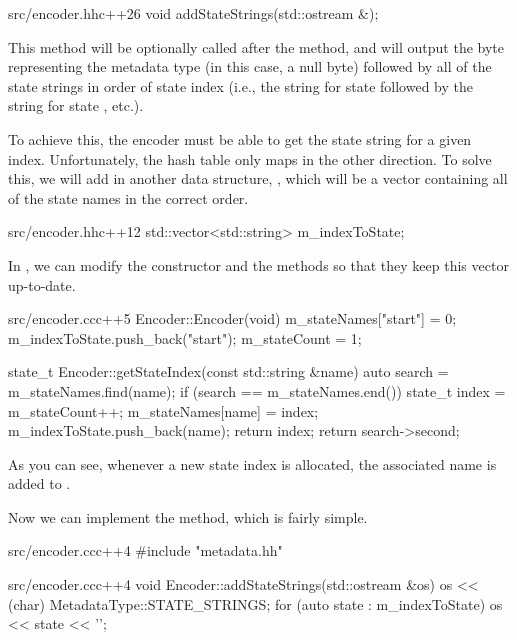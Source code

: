 \begin{file}{src/encoder.hh}{c++}{26}
    void addStateStrings(std::ostream &);
\end{file}

This method will be optionally called after the  method, and will output the byte representing the metadata type (in this case, a null byte) followed by all of the state strings in order of state index (i.e., the string for state  followed by the string for state , etc.).

To achieve this, the encoder must be able to get the state string for a given index. Unfortunately, the  hash table only maps in the other direction. To solve this, we will add in another data structure, , which will be a vector containing all of the state names in the correct order.

\begin{file}{src/encoder.hh}{c++}{12}
    std::vector<std::string> m_indexToState;
\end{file}

In , we can modify the constructor and the  methods so that they keep this vector up-to-date.

\begin{file}{src/encoder.cc}{c++}{5}
Encoder::Encoder(void)
{
    m_stateNames["start"] = 0;
    m_indexToState.push_back("start");
    m_stateCount = 1;
}

state_t Encoder::getStateIndex(const std::string &name)
{
    auto search = m_stateNames.find(name);
    if (search == m_stateNames.end())
    {
        state_t index = m_stateCount++;
        m_stateNames[name] = index;
        m_indexToState.push_back(name);
        return index;
    }
    return search->second;
}
\end{file}

As you can see, whenever a new state index is allocated, the associated name is added to .

Now we can implement the  method, which is fairly simple.

\begin{file}{src/encoder.cc}{c++}{4}
#include "metadata.hh"
\end{file}

\begin{file}{src/encoder.cc}{c++}{4}
void Encoder::addStateStrings(std::ostream &os)
{
    os << (char) MetadataType::STATE_STRINGS;
    for (auto state : m_indexToState)
    {
        os << state << '\0';
    }
}
\end{file}

